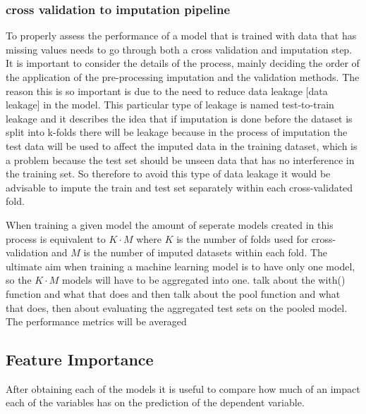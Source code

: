 \documentclass[11pt]{article}
\begin{document}
\subsubsection{cross validation to imputation pipeline}
To properly assess the performance of a model that is trained with data that has missing values needs to go through both a cross validation and imputation step. It is important to consider the details of the process, mainly deciding the order of the application of the pre-processing imputation and the validation methods. The reason this is so important is due to the need to reduce data leakage [data leakage] in the model. This particular type of leakage is named test-to-train leakage and it describes the idea that if imputation is done before the dataset is split into k-folds there will be leakage because in the process of imputation the test data will be used to affect the imputed data in the training dataset, which is a problem because the test set should be unseen data that has no interference in the training set. So therefore to avoid this type of data leakage it would be advisable to impute the train and test set separately within each cross-validated fold.

When training a given model the amount of seperate models created in this process is equivalent to \(K \cdot M\) where \(K\) is the number of folds used for cross-validation and \(M\) is the number of imputed datasets within each fold. The ultimate aim when training a machine learning model is to have only one model, so the \(K \cdot M \) models will have to be aggregated into one. talk about the with() function and what that does and then talk about the pool function and what that does, then about evaluating the aggregated test sets on the pooled model. The performance metrics will be averaged


\subsection{Feature Importance}
After obtaining each of the models it is useful to compare how much of an impact each of the variables has on the prediction of the dependent variable.

\end{document}
